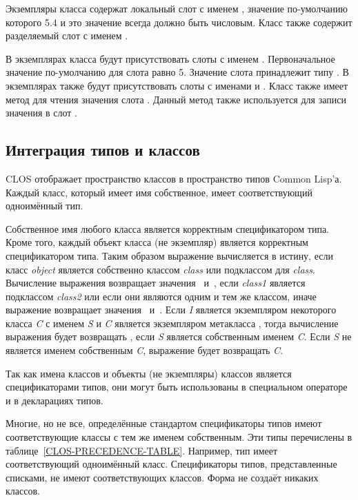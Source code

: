Экземпляры класса  содержат локальный слот с именем , значение
по-умолчанию которого 5.4 и это значение всегда должно быть числовым.
Класс  также содержит разделяемый слот с именем .

В экземплярах класса  будут присутствовать слоты с именем
. Первоначальное значение по-умолчанию для слота  равно 5.
Значение слота  принадлежит типу . В экземплярах
 также будут присутствовать слоты с именами  и . Класс
 также имеет метод  для чтения значения слота . Данный
метод также используется для записи значения в слот .

\subsection{Интеграция типов и классов} 
\label{Integrating-Types-and-Classes-SECTION} 

CLOS отображает пространство классов в пространство типов Common Lisp'а.
Каждый класс, который имеет имя собственное, имеет соответствующий одноимённый тип.

Собственное имя любого класса является корректным спецификатором типа. Кроме
того, каждый объект класса (не экземпляр) является корректным спецификатором
типа. Таким образом выражение  вычисляется в
истину, если класс \emph{object} является собственно классом \emph{class} или
подклассом для \emph{class}.
Вычисление выражения  возвращает значения
~и~, если \emph{class1} является подклассом \emph{class2} или если
они являются одним и тем же классом, иначе выражение возвращает значения
~и~. Если \emph{I} является экземпляром некоторого класса
\emph{C} с именем \emph{S} и \emph{C} является экземпляром метакласса
, тогда вычисление выражения  будет
возвращать , если \emph{S} является собственным именем \emph{C}. Если
\emph{S} не является именем собственным \emph{C}, выражение  будет возвращать \emph{C}.

Так как имена классов и объекты (не экземпляры) классов является спецификаторами
типов, они могут быть использованы в специальном операторе  и в
декларациях типов.

Многие, но не все, определённые стандартом спецификаторы типов имеют
соответствующие классы с тем же именем собственным. Эти типы перечислены в
таблице~\ref{CLOS-PRECEDENCE-TABLE}. Например, тип  имеет
соответствующий одноимённый класс. Спецификаторы типов, представленные списками,
не имеют соответствующих классов. Форма  не создаёт никаких классов.

